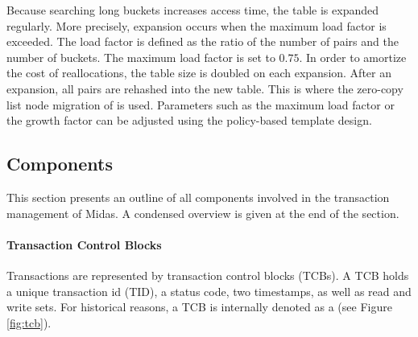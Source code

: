 Because searching long buckets increases access time, the table is expanded
regularly. More precisely, expansion occurs when the maximum load factor is
exceeded. The load factor is defined as the ratio of the number of pairs and the
number of buckets. The maximum load factor is set to $0.75$. In order to
amortize the cost of reallocations, the table size is doubled on each expansion.
After an expansion, all pairs are rehashed into the new table. This is where the
zero-copy list node migration of  is used. Parameters such as the
maximum load factor or the growth factor can be adjusted using the policy-based
template design.




\newpage

\subsection{Components}
\label{ch:impl-components}

This section presents an outline of all components involved in the transaction management of Midas. A condensed overview is given at the end of the section.

\paragraph{Transaction Control Blocks}

Transactions are represented by transaction control blocks (TCBs). A TCB holds a unique transaction id (TID), a status code, two timestamps, as well as read and write sets. For historical reasons, a TCB is internally denoted as a  (see Figure \ref{fig:tcb}).

